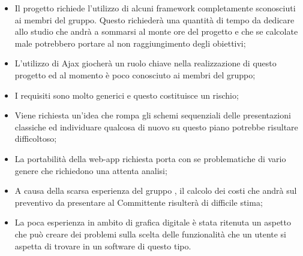 \begin{itemize}
	\item Il progetto \PROGETTO{} richiede l'utilizzo di alcuni framework completamente sconosciuti ai membri del gruppo. Questo richiederà una quantità di tempo da dedicare allo studio che andrà a sommarsi al monte ore del progetto e che se calcolate male potrebbero portare al non raggiungimento degli obiettivi;
	\item L'utilizzo di Ajax giocherà un ruolo chiave nella realizzazione di questo progetto ed al momento è poco conosciuto ai membri del gruppo;
	\item I requisiti sono molto generici e questo costituisce un rischio;
	\item Viene richiesta un'idea che rompa gli schemi sequenziali delle presentazioni classiche ed individuare qualcosa di nuovo su questo piano potrebbe risultare difficoltoso;
	\item La portabilità della web-app richiesta porta con se problematiche di vario genere che richiedono una attenta analisi;
	\item A causa della scarsa esperienza del gruppo \GRUPPO, il calcolo dei costi che andrà sul preventivo da presentare al Committente risulterà di difficile stima;
	\item La poca esperienza in ambito di grafica digitale è stata ritenuta un aspetto che può creare dei problemi sulla scelta delle funzionalità che un utente si aspetta di trovare in un software di questo tipo.
\end{itemize}
